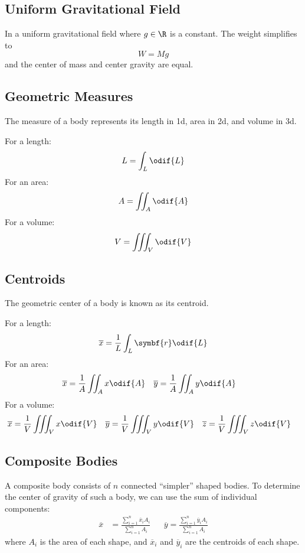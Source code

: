 \documentclass{article}
\begin{document}
\subsection{Uniform Gravitational Field}
In a uniform gravitational field where \(g \in \R\) is a constant. The weight simplifies to
\begin{equation*}
    W = Mg
\end{equation*}
and the center of mass and center gravity are equal.
\subsection{Geometric Measures}
The measure of a body represents its length in 1d, area in 2d, and volume in 3d.

For a length:
\begin{equation*}
    L = \int_L \odif{L}
\end{equation*}
For an area:
\begin{equation*}
    A = \iint_A \odif{A}
\end{equation*}
For a volume:
\begin{equation*}
    V = \iiint_V \odif{V}
\end{equation*}
\subsection{Centroids}
The geometric center of a body is known as its centroid.

For a length:
\begin{equation*}
    \overline{x} = \frac{1}{L} \int_L \symbf{r} \odif{L}
\end{equation*}
For an area:
\begin{align*}
    \overline{x} & = \frac{1}{A} \iint_A x \odif{A} &  & \overline{y} = \frac{1}{A} \iint_A y \odif{A}
\end{align*}
For a volume:
\begin{align*}
    \overline{x} & = \frac{1}{V} \iiint_V x \odif{V} &  & \overline{y} = \frac{1}{V} \iiint_V y \odif{V} &  & \overline{z} = \frac{1}{V} \iiint_V z \odif{V}
\end{align*}
\subsection{Composite Bodies}
A composite body consists of \(n\) connected ``simpler'' shaped bodies.
To determine the center of gravity of such a body, we can use the sum of individual
components:
\begin{align*}
    \overline{x} & = \frac{\sum_{i = 1}^n \overline{x}_i A_i}{\sum_{i = 1}^n A_i} &  & \overline{y} = \frac{\sum_{i = 1}^n \overline{y}_i A_i}{\sum_{i = 1}^n A_i}
\end{align*}
where \(A_i\) is the area of each shape, and \(\overline{x}_i\) and \(\overline{y}_i\) are the centroids of each shape.
\end{document}
